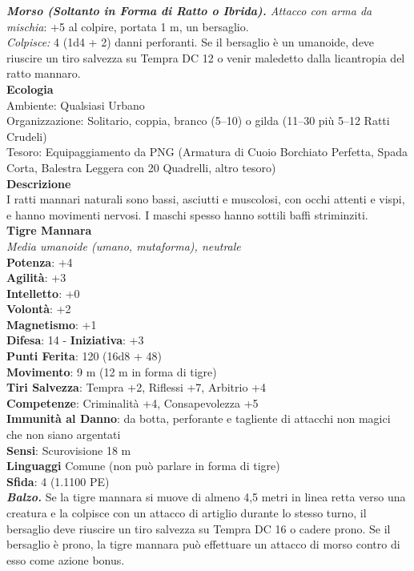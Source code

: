 \begin{multicols}{2}
\emph{\textbf{Morso (Soltanto in Forma di Ratto o Ibrida).} Attacco con arma da mischia}: +5 al colpire, portata 1 m, un bersaglio.\\

\emph{Colpisce:} 4 (1d4 + 2) danni perforanti. Se il bersaglio è un umanoide, deve riuscire un tiro salvezza su Tempra DC  12 o venir maledetto dalla licantropia del ratto mannaro.\\
\textbf{Ecologia}\\
Ambiente: Qualsiasi Urbano\\
Organizzazione: Solitario, coppia, branco (5–10) o gilda (11–30 più 5–12 Ratti Crudeli)\\
Tesoro: Equipaggiamento da PNG (Armatura di Cuoio Borchiato Perfetta, Spada Corta, Balestra Leggera con 20 Quadrelli, altro tesoro)\\
\textbf{Descrizione}\\
I ratti mannari naturali sono bassi, asciutti e muscolosi, con occhi attenti e vispi, e hanno movimenti nervosi. I maschi spesso hanno sottili baffi striminziti.\\

\medskip\textbf{Tigre Mannara}\\
\emph{Media umanoide (umano, mutaforma), neutrale}\\
\textbf{Potenza}: +4\\
\textbf{Agilità}: +3\\
\textbf{Intelletto}: +0\\
\textbf{Volontà}: +2\\
\textbf{Magnetismo}: +1\\
\textbf{Difesa}: 14 - \textbf{Iniziativa}: +3\\
\textbf{Punti Ferita}: 120 (16d8 + 48)\\
\textbf{Movimento}: 9 m (12 m in forma di tigre)\\
\textbf{Tiri Salvezza}: Tempra +2, Riflessi +7, Arbitrio +4\\
\textbf{Competenze}: Criminalità +4, Consapevolezza +5\\
\textbf{Immunità al Danno}: da botta, perforante e tagliente di attacchi non magici che non siano argentati\\
\textbf{Sensi}: Scurovisione 18 m\\
\textbf{Linguaggi} Comune (non può parlare in forma di tigre)\\
\textbf{Sfida}: 4 (1.1100 PE)\smallskip\\
\emph{\textbf{Balzo.}} Se la tigre mannara si muove di almeno 4,5 metri in linea retta verso una creatura e la colpisce con un attacco di artiglio durante lo stesso turno, il bersaglio deve riuscire un tiro salvezza su Tempra DC  16 o cadere prono. Se il bersaglio è prono, la tigre mannara può effettuare un attacco di morso contro di esso come azione bonus.\\


\end{multicols}
